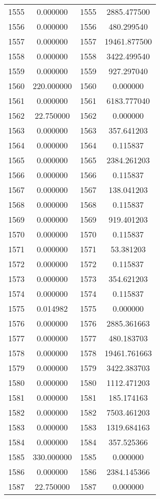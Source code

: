 \documentclass[12pt]{article}
\begin{document}
\begin{longtable}{@{}cccc@{}}
1555 & 0.000000 & 1555 & 2885.477500 \\
1556 & 0.000000 & 1556 & 480.299540 \\
1557 & 0.000000 & 1557 & 19461.877500 \\
1558 & 0.000000 & 1558 & 3422.499540 \\
1559 & 0.000000 & 1559 & 927.297040 \\
1560 & 220.000000 & 1560 & 0.000000 \\
1561 & 0.000000 & 1561 & 6183.777040 \\
1562 & 22.750000 & 1562 & 0.000000 \\
1563 & 0.000000 & 1563 & 357.641203 \\
1564 & 0.000000 & 1564 & 0.115837 \\
1565 & 0.000000 & 1565 & 2384.261203 \\
1566 & 0.000000 & 1566 & 0.115837 \\
1567 & 0.000000 & 1567 & 138.041203 \\
1568 & 0.000000 & 1568 & 0.115837 \\
1569 & 0.000000 & 1569 & 919.401203 \\
1570 & 0.000000 & 1570 & 0.115837 \\
1571 & 0.000000 & 1571 & 53.381203 \\
1572 & 0.000000 & 1572 & 0.115837 \\
1573 & 0.000000 & 1573 & 354.621203 \\
1574 & 0.000000 & 1574 & 0.115837 \\
1575 & 0.014982 & 1575 & 0.000000 \\
1576 & 0.000000 & 1576 & 2885.361663 \\
1577 & 0.000000 & 1577 & 480.183703 \\
1578 & 0.000000 & 1578 & 19461.761663 \\
1579 & 0.000000 & 1579 & 3422.383703 \\
1580 & 0.000000 & 1580 & 1112.471203 \\
1581 & 0.000000 & 1581 & 185.174163 \\
1582 & 0.000000 & 1582 & 7503.461203 \\
1583 & 0.000000 & 1583 & 1319.684163 \\
1584 & 0.000000 & 1584 & 357.525366 \\
1585 & 330.000000 & 1585 & 0.000000 \\
1586 & 0.000000 & 1586 & 2384.145366 \\
1587 & 22.750000 & 1587 & 0.000000 \\

\end{longtable}
\end{document}
